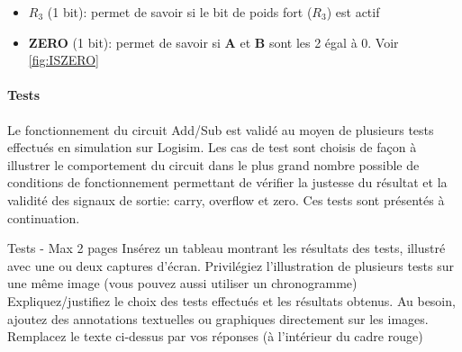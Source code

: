 \documentclass[a4paper]{article}
\begin{document}
\begin{tcolorbox}[colframe=Monokaimagenta,colback=white]
\begin{itemize}
    \item $R_3$ (1 bit): permet de savoir si le bit de poids fort ($R_3$) est actif 
    \item \textbf{ZERO}  (1 bit): permet de savoir si \textbf{A} et \textbf{B} sont les 2 égal à 0. Voir \ref{fig:ISZERO}
\end{itemize}
    
\end{tcolorbox}
\paragraph{Tests} 
Le fonctionnement du circuit Add/Sub est validé au moyen de plusieurs tests effectués en  simulation sur Logisim. Les cas de test sont choisis de façon à illustrer le comportement du circuit dans le plus grand nombre possible de conditions de fonctionnement permettant de vérifier la justesse du résultat et la validité des signaux de sortie: carry, overflow et zero. Ces tests sont présentés à continuation.\\

\begin{tcolorbox}[colframe=Monokaimagenta,colback=white]
Tests - Max 2 pages 
Insérez  un tableau montrant les résultats des tests, illustré avec une ou deux captures d’écran. Privilégiez l’illustration de plusieurs tests sur une même image (vous pouvez aussi utiliser un chronogramme)
Expliquez/justifiez le choix des tests effectués et les résultats obtenus.
Au besoin, ajoutez des annotations textuelles ou graphiques directement sur les images.
Remplacez le texte ci-dessus par vos réponses (à l’intérieur du cadre rouge)
\end{tcolorbox}
\end{document}
